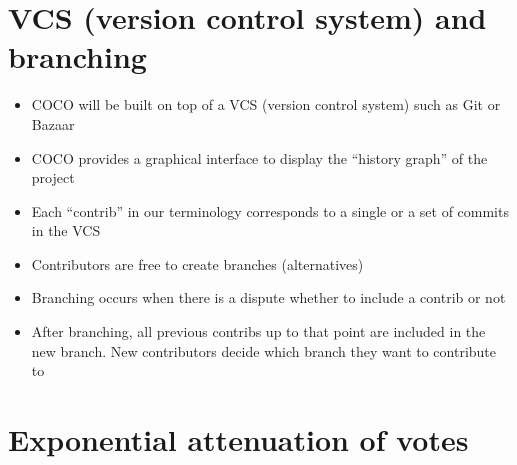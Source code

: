 \documentclass[12pt, orivec, fleqn]{article}
\begin{document}
\secttoc
\section{VCS (version control system) and branching}

\begin{itemize}
	\item COCO will be built on top of a VCS (version control system) such as Git or Bazaar
	
	\item COCO provides a graphical interface to display the ``history graph'' of the project
	
	\item Each ``contrib'' in our terminology corresponds to a single or a set of commits in the VCS
	
	\item Contributors are free to create branches (alternatives)

	\item Branching occurs when there is a dispute whether to include a contrib or not

	\item After branching, all previous contribs up to that point are included in the new branch.  New contributors decide which branch they want to contribute to
\end{itemize}

\secttoc
\section{Exponential attenuation of votes}
\end{document}
